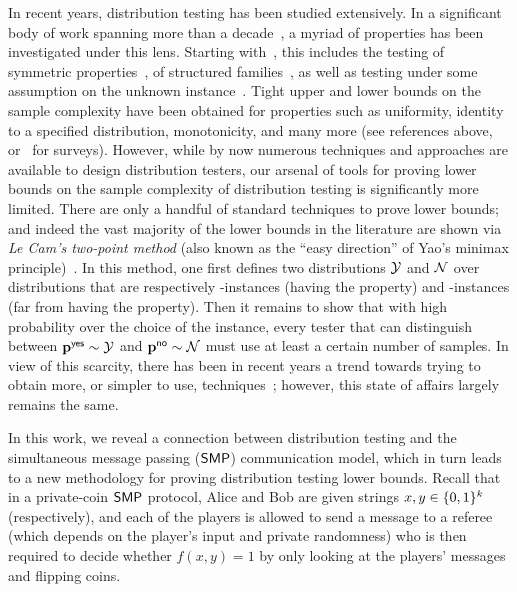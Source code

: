 In recent years, distribution testing has been studied extensively. In a significant body of work spanning more than a decade~\cite{BFFKRW:01,Paninski:04,BDKR:05,Paninski:08,ADJOP:11,BFRV:11,LRR:13,VV:14,CDVV:14,WY:14,JVW:14,BV:15,DK:16}, a myriad of properties has been investigated under this lens. Starting with~\cite{GRexp:00,BFRSW:10,BFFKRW:01}, this includes the testing of symmetric properties~\cite{RRSS:09,Valiant:11,VV:11:stoc,ValiantValiant:11}, of structured families~\cite{BKR:04,ILR:12,AD:15,Canonne:15,ADK:15,CDGR:16,Canonne:16}, as well as testing under some assumption on the unknown instance~\cite{RS:09,DDSVV:13,DKN:15,DKN:15:FOCS}. Tight upper and lower bounds on the sample complexity have been obtained for properties such as uniformity, identity to a specified distribution, monotonicity, and many more (see references above, or~\cite{Rubinfeld:12:Survey,Canonne:15:Survey} for surveys).
 However, while by now numerous techniques and approaches are available to design distribution testers, our arsenal of tools for proving lower bounds on the sample complexity of distribution testing is significantly more limited. There are only a handful of standard techniques to prove lower bounds; and indeed the vast majority of the lower bounds in the literature are shown via \emph{Le Cam's two-point method} (also known as the ``easy direction'' of Yao's minimax principle)~\cite{Yu:97,Pollard:2003}. In this method, one first defines two distributions $\cal Y$ and $\cal N$ over distributions that are respectively \yes-instances (having the property) and \no-instances (far from having the property). Then it remains to show that with high probability over the choice of the instance, every tester that can distinguish between $\mathbf{p}^{\textsf{yes}} \sim \cal Y$ and $\mathbf{p}^{\textsf{no}} \sim \cal N$ must use at least a certain number of samples. In view of this scarcity, there has been in recent years a trend towards trying to obtain more, or simpler to use, techniques~\cite{Valiant:11,DK:16}; however, this state of affairs largely remains the same.

In this work, we reveal a connection between distribution testing and the simultaneous message passing ($\mathsf{SMP}$) communication model, which in turn leads to a new methodology for proving distribution testing lower bounds. Recall that in a private-coin $\mathsf{SMP}$ protocol, Alice and Bob are given strings $x,y \in \{0,1\}^k$ (respectively), and each of the players is allowed to send a message to a referee (which depends on the player's input and private randomness) who is then required to decide whether $f(x,y)=1$ by only looking at the players' messages and flipping coins.

